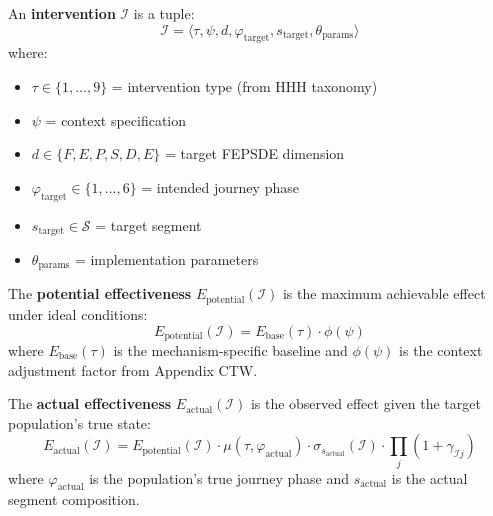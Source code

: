 \begin{definition}[Intervention]
\label{def:intervention}
An \textbf{intervention} $\mathcal{I}$ is a tuple:
\begin{equation}
\mathcal{I} = \langle \tau, \psi, d, \varphi_{\text{target}}, s_{\text{target}}, \theta_{\text{params}} \rangle
\end{equation}
where:
\begin{itemize}[nosep]
\item $\tau \in \{1, \ldots, 9\}$ = intervention type (from HHH taxonomy)
\item $\psi$ = context specification
\item $d \in \{F, E, P, S, D, E\}$ = target FEPSDE dimension
\item $\varphi_{\text{target}} \in \{1, \ldots, 6\}$ = intended journey phase
\item $s_{\text{target}} \in \mathcal{S}$ = target segment
\item $\theta_{\text{params}}$ = implementation parameters
\end{itemize}
\end{definition}

\begin{definition}
\label{def:potential}
The \textbf{potential effectiveness} $E_{\text{potential}}(\mathcal{I})$ is the
maximum achievable effect under ideal conditions:
\begin{equation}
E_{\text{potential}}(\mathcal{I}) = E_{\text{base}}(\tau) \cdot \phi(\psi)
\end{equation}
where $E_{\text{base}}(\tau)$ is the mechanism-specific baseline and $\phi(\psi)$
is the context adjustment factor from Appendix CTW.
\end{definition}

\begin{definition}
\label{def:actual}
The \textbf{actual effectiveness} $E_{\text{actual}}(\mathcal{I})$ is the observed
effect given the target population's true state:
\begin{equation}
E_{\text{actual}}(\mathcal{I}) = E_{\text{potential}}(\mathcal{I}) \cdot \mu(\tau, \varphi_{\text{actual}}) \cdot \sigma_{s_{\text{actual}}}(\mathcal{I}) \cdot \prod_j (1 + \gamma_{\mathcal{I}j})
\end{equation}
where $\varphi_{\text{actual}}$ is the population's true journey phase and
$s_{\text{actual}}$ is the actual segment composition.
\end{definition}

